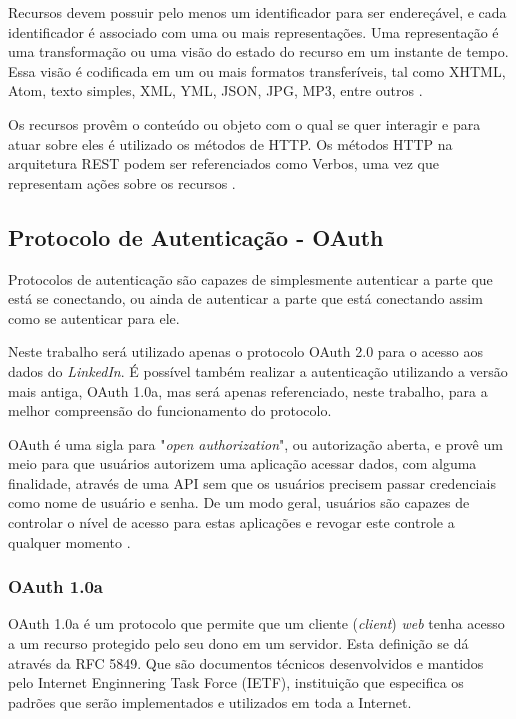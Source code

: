 Recursos devem possuir pelo menos um identificador para ser endereçável, e cada identificador é associado com uma ou mais representações. Uma representação é uma transformação ou uma visão do estado do recurso em um instante de tempo. Essa visão é codificada em um ou mais formatos transferíveis, tal como XHTML, Atom, texto simples, XML, YML, JSON, JPG, MP3, entre outros  \cite{rest-book}.

Os recursos provêm o conteúdo ou objeto com o qual se quer interagir e para atuar sobre eles é utilizado os métodos de HTTP. Os métodos HTTP na arquitetura REST podem ser referenciados como Verbos, uma vez que representam ações sobre os recursos \cite{rest-book}.


\subsection{Protocolo de Autenticação - OAuth}
Protocolos de autenticação são capazes de simplesmente autenticar a parte que está se conectando, ou ainda de autenticar a parte que está conectando assim como se autenticar para ele.

Neste trabalho será utilizado apenas o protocolo OAuth 2.0 para o acesso aos dados do \textit{LinkedIn}. É possível também realizar a autenticação utilizando a versão mais antiga, OAuth 1.0a, mas será apenas referenciado, neste trabalho, para a melhor compreensão do funcionamento do protocolo.

OAuth é uma sigla para "\textit{open authorization}", ou autorização aberta, e provê um meio para que usuários autorizem uma aplicação acessar dados, com alguma finalidade, através de uma API sem que os usuários precisem passar credenciais como nome de usuário e senha. De um modo geral, usuários são capazes de controlar o nível de acesso para estas aplicações e revogar este controle a qualquer momento \cite{mining-social-web}.

\subsubsection{\textbf{OAuth 1.0a}}
OAuth 1.0a é um protocolo que permite que um cliente (\textit{client}) \textit{web} tenha acesso a um recurso protegido pelo seu dono em um servidor. Esta definição se dá através da RFC 5849. Que são documentos técnicos desenvolvidos e mantidos pelo Internet Enginnering Task Force (IETF), instituição que especifica os padrões que serão implementados e utilizados em toda a Internet.

